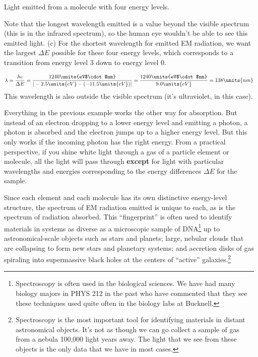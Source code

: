 \begin{example}{Light emitted from a molecule with four energy levels.}
\begin{solution}
Note that the longest wavelength emitted is a value beyond the visible spectrum
(this is in the infrared spectrum), so the human eye wouldn't be able
to see this emitted light. 
(c) For the shortest wavelength for emitted EM radiation, we want the
largest $\Delta E$ possible for these four energy levels, which corresponds
to a transition from energy level 3 down to energy level 0. 

\begin{equation}
\lambda = \frac{hc}{\Delta E} = \frac{1240 \units{eV$\cdot$nm}}{|-2.5 \units{eV} - (-11.5 \units{eV})|} 
= \frac{1240 \units{eV$\cdot$nm}}{9.0 \units{eV}} = 138 \units{nm} \nonumber
\end{equation}
This wavelength is also outside the visible spectrum (it's ultraviolet, in 
this case).
\end{solution}
\end{example}

Everything in the previous example works the other way for absorption. 
But instead of an electron dropping to a lower energy level and emitting
a photon, a photon is absorbed and the electron jumps up to a higher
energy level. But this only works if the incoming photon has the right
energy. From a practical perspective, if you shine white light through
a gas of a particle element or molecule, all the light will pass through
{\bf except} for light with particular wavelengths and energies corresponding
to the energy differences $\Delta E$ for the sample.

Since each element and each molecule has its own distinctive energy-level
structure, the spectrum of EM radiation emitted is unique to each, as
is the spectrum of radiation absorbed. This
``fingerprint'' is often used to identify materials in systems as diverse
as a microscopic sample of DNA\footnote{Spectroscopy is often used in
the biological sciences. We have had many biology majors in PHYS 212
in the past who have commented that they see these techniques used quite
often in the biology labs at Bucknell.} up to astronomical-scale objects
such as stars and planets; large, nebular clouds that are collapsing to 
form new stars and planetary systems; and accretion disks of gas spiraling
into supermassive black holes at the centers of ``active'' 
galaxies.\footnote{Spectroscopy is the most important tool for identifying 
materials in distant astronomical objects. It's not as though we can go
collect a sample of gas from a nebula 100,000 light years away. The light
that we see from these objects is the only data that we have in most
cases.}

